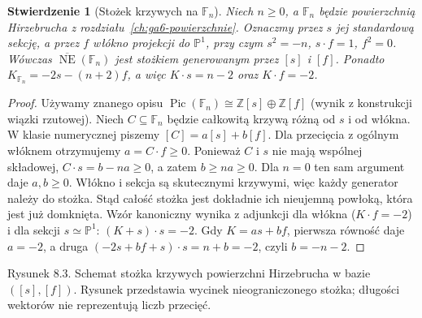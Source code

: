 \documentclass[11pt,a4paper,openany]{report}
\numberwithin{equation}{section}
\theoremstyle{plain}
\newtheorem{stwierdzenie}[twierdzenie]{Stwierdzenie}
\theoremstyle{definition}
\theoremstyle{remark}
\newcommand{\Z}{\mathbb Z}
\newcommand{\PP}{\mathbb P}
\begin{document}
\begin{stwierdzenie}[Stożek krzywych na $\mathbb F_n$]
\label{st:ga8-fn-cone}
Niech $n\ge0$, a $\mathbb F_n$ będzie powierzchnią
Hirzebrucha z rozdziału~\ref{ch:ga6-powierzchnie}.
Oznaczmy przez $s$ jej standardową sekcję, a przez $f$
włókno projekcji do $\PP^1$, przy czym
$s^2=-n$, $s\cdot f=1$, $f^2=0$.
Wówczas $\overline{\operatorname{NE}}(\mathbb F_n)$
jest stożkiem generowanym przez $[s]$ i $[f]$.
Ponadto $K_{\mathbb F_n}=-2s-(n+2)f$,
a więc $K\cdot s=n-2$ oraz $K\cdot f=-2$.
\end{stwierdzenie}
\begin{proof}
Używamy znanego opisu $\operatorname{Pic}(\mathbb F_n)
\cong\Z[s]\oplus\Z[f]$ (wynik z konstrukcji
wiązki rzutowej). Niech $C\subseteq\mathbb F_n$
będzie całkowitą krzywą różną od $s$ i od włókna.
W klasie numerycznej piszemy $[C]=a[s]+b[f]$.
Dla przecięcia z ogólnym włóknem otrzymujemy
$a=C\cdot f\ge0$. Ponieważ $C$ i $s$ nie mają
wspólnej składowej, $C\cdot s=b-na\ge0$,
a zatem $b\ge na\ge0$. Dla $n=0$ ten sam argument
daje $a,b\ge0$. Włókno i sekcja są skutecznymi
krzywymi, więc każdy generator należy do stożka.
Stąd całość stożka jest dokładnie ich nieujemną
powłoką, która jest już domknięta.
Wzór kanoniczny wynika z adjunkcji dla włókna
($K\cdot f=-2$) i dla sekcji $s\simeq\PP^1$:
$(K+s)\cdot s=-2$. Gdy $K=as+bf$, pierwsza
równość daje $a=-2$, a druga $(-2s+bf+s)\cdot s
=n+b=-2$, czyli $b=-n-2$.
\end{proof}

\begin{center}

{\small Rysunek 8.3. Schemat stożka krzywych powierzchni
Hirzebrucha w bazie $([s],[f])$. Rysunek przedstawia
wycinek nieograniczonego stożka; długości wektorów
nie reprezentują liczb przecięć.}\par
\end{center}
\end{document}
